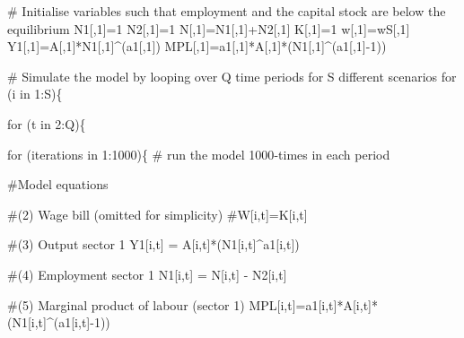 \documentclass[
  letterpaper,
  DIV=11,
  numbers=noendperiod]{scrreprt}
\newenvironment{Shaded}{\begin{snugshade}}{\end{snugshade}}
\newcommand{\CommentTok}[1]{\textcolor[rgb]{0.37,0.37,0.37}{#1}}
\newcommand{\ControlFlowTok}[1]{\textcolor[rgb]{0.00,0.23,0.31}{#1}}
\newcommand{\DecValTok}[1]{\textcolor[rgb]{0.68,0.00,0.00}{#1}}
\newcommand{\NormalTok}[1]{\textcolor[rgb]{0.00,0.23,0.31}{#1}}
\newcommand{\OtherTok}[1]{\textcolor[rgb]{0.00,0.23,0.31}{#1}}
\newcommand{\SpecialCharTok}[1]{\textcolor[rgb]{0.37,0.37,0.37}{#1}}
\begin{document}
\begin{Shaded}
\begin{Highlighting}[]
\CommentTok{\# Initialise variables such that employment and the capital stock are below the equilibrium}
\NormalTok{N1[,}\DecValTok{1}\NormalTok{]}\OtherTok{=}\DecValTok{1}
\NormalTok{N2[,}\DecValTok{1}\NormalTok{]}\OtherTok{=}\DecValTok{1}
\NormalTok{N[,}\DecValTok{1}\NormalTok{]}\OtherTok{=}\NormalTok{N1[,}\DecValTok{1}\NormalTok{]}\SpecialCharTok{+}\NormalTok{N2[,}\DecValTok{1}\NormalTok{]}
\NormalTok{K[,}\DecValTok{1}\NormalTok{]}\OtherTok{=}\DecValTok{1}
\NormalTok{w[,}\DecValTok{1}\NormalTok{]}\OtherTok{=}\NormalTok{wS[,}\DecValTok{1}\NormalTok{]}
\NormalTok{Y1[,}\DecValTok{1}\NormalTok{]}\OtherTok{=}\NormalTok{A[,}\DecValTok{1}\NormalTok{]}\SpecialCharTok{*}\NormalTok{N1[,}\DecValTok{1}\NormalTok{]}\SpecialCharTok{\^{}}\NormalTok{(a1[,}\DecValTok{1}\NormalTok{])}
\NormalTok{MPL[,}\DecValTok{1}\NormalTok{]}\OtherTok{=}\NormalTok{a1[,}\DecValTok{1}\NormalTok{]}\SpecialCharTok{*}\NormalTok{A[,}\DecValTok{1}\NormalTok{]}\SpecialCharTok{*}\NormalTok{(N1[,}\DecValTok{1}\NormalTok{]}\SpecialCharTok{\^{}}\NormalTok{(a1[,}\DecValTok{1}\NormalTok{]}\SpecialCharTok{{-}}\DecValTok{1}\NormalTok{))}

\CommentTok{\# Simulate the model by looping over Q time periods for S different scenarios}
\ControlFlowTok{for}\NormalTok{ (i }\ControlFlowTok{in} \DecValTok{1}\SpecialCharTok{:}\NormalTok{S)\{}

  \ControlFlowTok{for}\NormalTok{ (t }\ControlFlowTok{in} \DecValTok{2}\SpecialCharTok{:}\NormalTok{Q)\{}
    
    \ControlFlowTok{for}\NormalTok{ (iterations }\ControlFlowTok{in} \DecValTok{1}\SpecialCharTok{:}\DecValTok{1000}\NormalTok{)\{ }\CommentTok{\# run the model 1000{-}times in each period}
      
    \CommentTok{\#Model equations}
      
      \CommentTok{\#(2) Wage bill (omitted for simplicity)}
      \CommentTok{\#W[i,t]=K[i,t] }

      \CommentTok{\#(3) Output sector 1}
\NormalTok{      Y1[i,t] }\OtherTok{=}\NormalTok{ A[i,t]}\SpecialCharTok{*}\NormalTok{(N1[i,t]}\SpecialCharTok{\^{}}\NormalTok{a1[i,t])}
      
      \CommentTok{\#(4) Employment sector 1}
\NormalTok{      N1[i,t] }\OtherTok{=}\NormalTok{ N[i,t] }\SpecialCharTok{{-}}\NormalTok{ N2[i,t]}

      \CommentTok{\#(5) Marginal product of labour (sector 1)}
\NormalTok{      MPL[i,t]}\OtherTok{=}\NormalTok{a1[i,t]}\SpecialCharTok{*}\NormalTok{A[i,t]}\SpecialCharTok{*}\NormalTok{(N1[i,t]}\SpecialCharTok{\^{}}\NormalTok{(a1[i,t]}\SpecialCharTok{{-}}\DecValTok{1}\NormalTok{))}


\end{Highlighting}
\end{Shaded}
\end{document}
